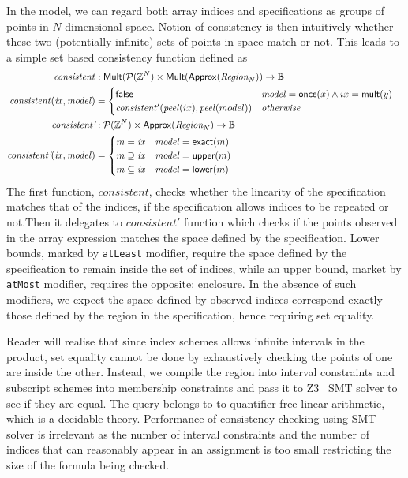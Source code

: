 In the model, we can regard both array indices and specifications as groups of
points in $N$-dimensional space. Notion of consistency is then intuitively
whether these two (potentially infinite) sets of points in space match or not.
This leads to a simple set based consistency function defined as
%
\begin{align*}
  \mathit{consistent} & :
    \mathsf{Mult}(\mathcal{P}(\bz{}^N) \times
    \mathsf{Mult}(\mathsf{Approx}(\region{N})) \to \mathbb{B} & \\
%
  \mathit{consistent}(\mathit{ix}, \mathit{model}) & = \begin{cases}
    \mathsf{false} & \mathit{model} = \mathsf{once}(x) \wedge ix = \mathsf{mult}(y) \\
    \mathit{consistent'}(\mathit{peel}(ix), \mathit{peel}(model)) & \textit{otherwise}
  \end{cases} \\
%
  \textit{consistent'} & :
    \mathcal{P}(\bz{}^N) \times
    \mathsf{Approx}(\region{N}) \to \mathbb{B} & \\
%
  \textit{consistent'}(\mathit{ix}, \mathit{model}) & = \begin{cases}
    m = \mathit{ix} & \mathit{model} = \mathsf{exact}(m) \\
    m \supseteq \mathit{ix} & \mathit{model} = \mathsf{upper}(m) \\
    m \subseteq \mathit{ix} & \mathit{model} = \mathsf{lower}(m)
  \end{cases}
\end{align*}
%
The first function, $\mathit{consistent}$, checks whether the linearity of the
specification matches that of the indices, \ie{} if the specification allows
indices to be repeated or not.Then it delegates to $\mathit{consistent'}$
function which checks if the points observed in the array expression matches
the space defined by the specification. Lower bounds, marked by \texttt{atLeast}
modifier, require the space defined by the specification to remain inside the
set of indices, while an upper bound, market by \texttt{atMost} modifier,
requires the opposite: enclosure. In the absence of such modifiers, we expect
the space defined by observed indices correspond exactly those defined by the
region in the specification, hence requiring set equality.

Reader will realise that since index schemes allows infinite intervals in the
product, set equality cannot be done by exhaustively checking the points of one
are inside the other. Instead, we compile the region into interval constraints
and subscript schemes into membership constraints and pass it to
\textsc{Z3}~\citep{de2008z3} SMT solver to see if they are equal. The query
belongs to to quantifier free linear arithmetic, which is a decidable theory.
Performance of consistency checking using SMT solver is irrelevant as the number
of interval constraints and the number of indices that can reasonably appear in
an assignment is too small restricting the size of the formula being checked.

